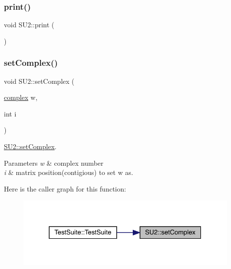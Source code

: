 \mbox{\label{class_s_u2_a1210d531ef84574deb5f03dd24de80cf}} 
\subsubsection{\texorpdfstring{print()}{print()}}
{\footnotesize\ttfamily void S\+U2\+::print (\begin{DoxyParamCaption}{ }\end{DoxyParamCaption})}

\mbox{\label{class_s_u2_afe1d093aaf7325c1a7490f84e4c59b12}} 
\subsubsection{\texorpdfstring{setComplex()}{setComplex()}}
{\footnotesize\ttfamily void S\+U2\+::set\+Complex (\begin{DoxyParamCaption}\item[{\mbox{\hyperlink{classcomplex}{complex}}}]{w,  }\item[{int}]{i }\end{DoxyParamCaption})}



\mbox{\hyperlink{class_s_u2_afe1d093aaf7325c1a7490f84e4c59b12}{S\+U2\+::set\+Complex}}. 


\begin{DoxyParams}{Parameters}
{\em w} & complex number \\
\hline
{\em i} & matrix position(contigious) to set w as. \\
\hline
\end{DoxyParams}
Here is the caller graph for this function\+:
\nopagebreak
\begin{figure}[H]
\begin{center}
\leavevmode
\includegraphics[width=314pt]{class_s_u2_afe1d093aaf7325c1a7490f84e4c59b12_icgraph}
\end{center}
\end{figure}
\mbox{\label{class_s_u2_a798389d4b2bc24cea6a466473004e3f8}} 
